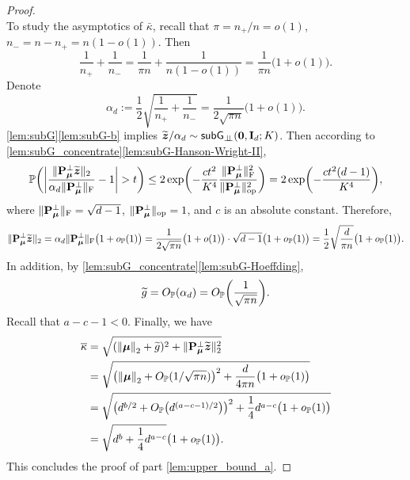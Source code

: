 \begin{proof}
~\\
\noindent
To study the asymptotics of $\bar\kappa$, recall that $\pi = n_+/n = o(1)$, $n_- = n - n_+ = n(1 - o(1))$. Then
\begin{equation*}
    \frac{1}{n_+} + \frac{1}{n_-} = \frac{1}{\pi n } + \frac{1}{n(1 - o(1))} = \frac{1}{\pi n}\bigl(1 + o(1)\bigr).
\end{equation*}
Denote
\begin{equation}\label{eq:alpha_d}
    \alpha_d := \frac12 \sqrt{ \frac{1}{n_+} + \frac{1}{n_-} }
    = \frac{1}{2\sqrt{\pi n}}\bigl(1 + o(1)\bigr).
\end{equation}
\cref{lem:subG}\ref{lem:subG-b} implies $\widetilde{\text{\boldmath $z$}}/\alpha_d \sim {\sf{subG}_{\perp\!\!\!\perp}}(\mathrm{\bf 0}, \mathrm{\bf I}_d; K)$. Then according to \cref{lem:subG_concentrate}\ref{lem:subG-Hanson-Wright-II},
\begin{equation*}
    \mathbb{P}\biggl( \biggl| \frac{\| \mathrm{\bf P}_{{\boldsymbol{\mu}}}^\perp \widetilde{\text{\boldmath $z$}} \|_2}{ \alpha_d \| \mathrm{\bf P}_{{\boldsymbol{\mu}}}^\perp \|_\mathrm{F}} - 1 \biggr| > t \biggr)
    \le 2 \exp\biggl( -\frac{ct^2}{K^4}\frac{\| \mathrm{\bf P}_{{\boldsymbol{\mu}}}^\perp \|_\mathrm{F}^2}{\| \mathrm{\bf P}_{{\boldsymbol{\mu}}}^\perp \|_{\mathrm{op}}^2} \biggr)
    = 2 \exp\biggl( -\frac{ct^2(d-1)}{K^4} \biggr) ,
\end{equation*}
where $\| \mathrm{\bf P}_{{\boldsymbol{\mu}}}^\perp \|_\mathrm{F} = \sqrt{d - 1}$, $\| \mathrm{\bf P}_{{\boldsymbol{\mu}}}^\perp \|_{\mathrm{op}} = 1$, and $c$ is an absolute constant. Therefore,
\begin{equation} \label{eq:P_wtz}
    \| \mathrm{\bf P}_{{\boldsymbol{\mu}}}^\perp \widetilde{\text{\boldmath $z$}} \|_2 = \alpha_d \| \mathrm{\bf P}_{{\boldsymbol{\mu}}}^\perp \|_\mathrm{F} \bigl(1 + o_{\mathbb{P}}(1)\bigr)
    = \frac{1}{2\sqrt{\pi n}}\big(1 + o(1) \big) \cdot \sqrt{d - 1}\bigl(1 + o_{\mathbb{P}}(1)\bigr) 
    = \frac12 \sqrt{\frac{d}{\pi n}}\big(1 + o_{\mathbb{P}}(1) \big).
\end{equation}
In addition, by \cref{lem:subG_concentrate}\ref{lem:subG-Hoeffding},
\begin{equation*}
    \widetilde g = O_{\mathbb{P}}(\alpha_d) = O_{\mathbb{P}}\biggl( \frac{1}{\sqrt{\pi n}} \biggr).
\end{equation*}
Recall that $a - c - 1 < 0$. Finally, we have
\begin{align}
        \overline\kappa 
    & = \sqrt{ ( \left\|{{\boldsymbol{\mu}}}\right\|_2 + \widetilde g )^2 + \| \mathrm{\bf P}_{{\boldsymbol{\mu}}}^\perp \widetilde{\text{\boldmath $z$}} \|_2^2 } \nonumber \\
    & = \sqrt{ \left( \left\|{{\boldsymbol{\mu}}}\right\|_2 + O_{\mathbb{P}}(1/\sqrt{\pi n}) \right)^2 + \frac{d}{4\pi n}\bigl(1 + o_{\mathbb{P}}(1)\bigr) }
    \nonumber \\
    & =  \sqrt{ \left( d^{b/2} + O_{\mathbb{P}}\bigl(d^{(a-c-1)/2}\bigr) \right)^2 + \frac{1}{4} d^{a - c} \bigl(1 + o_{\mathbb{P}}(1)\bigr) }
    \nonumber \\
    & = \sqrt{ d^{b} +  \frac{1}{4} d^{a-c} } \bigl(1 + o_{\mathbb{P}}(1)\bigr).
    \label{eq:margin_upper}
\end{align}
This concludes the proof of part \ref{lem:upper_bound_a}.


\end{proof}
